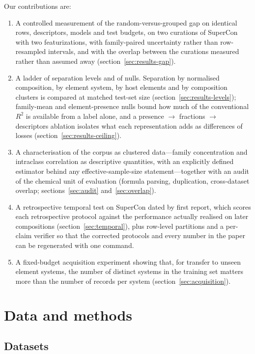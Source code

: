 \documentclass{iopjournal}
\newcommand{\Rsq}{R^{2}}
\begin{document}
Our contributions are:
\begin{enumerate}
\item A controlled measurement of the random-versus-grouped gap on identical rows, descriptors,
      models and test budgets, on two curations of SuperCon with two featurizations, with
      family-paired uncertainty rather than row-resampled intervals, and with the overlap between the
      curations measured rather than assumed away (section~\ref{sec:results-gap}).
\item A ladder of separation levels and of nulls. Separation by normalised composition, by element
      system, by host elements and by composition clusters is compared at matched test-set size
      (section~\ref{sec:results-levels}); family-mean and element-presence nulls bound how much of the
      conventional $\Rsq$ is available from a label alone, and a presence $\to$ fractions $\to$
      descriptors ablation isolates what each representation adds as differences of losses
      (section~\ref{sec:results-ceiling}).
\item A characterisation of the corpus as clustered data---family concentration and intraclass
      correlation as descriptive quantities, with an explicitly defined estimator behind any
      effective-sample-size statement---together with an audit of the chemical unit of evaluation
      (formula parsing, duplication, cross-dataset overlap; sections~\ref{sec:audit}
      and~\ref{sec:overlap}).
\item A retrospective temporal test on SuperCon dated by first report, which scores each retrospective
      protocol against the performance actually realised on later compositions
      (section~\ref{sec:temporal}), plus row-level partitions and a per-claim verifier so that the
      corrected protocols and every number in the paper can be regenerated with one command.
\item A fixed-budget acquisition experiment showing that, for transfer to unseen element systems, the number of distinct systems in the training set matters more than the number of records per system (section~\ref{sec:acquisition}).
\end{enumerate}

\section{Data and methods}

\subsection{Datasets}
\label{sec:data}
\end{document}
